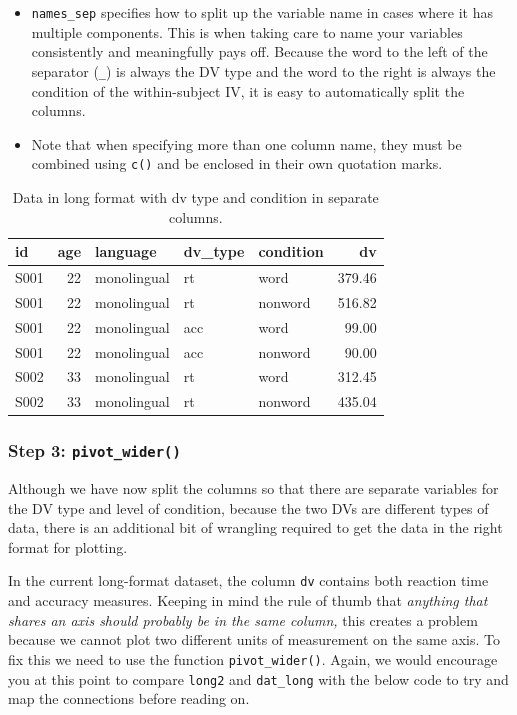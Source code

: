 \documentclass[
  english,
  doc,floatsintext]{apa6}
\begin{document}
\begin{itemize}
\item
  \texttt{names\_sep} specifies how to split up the variable name in cases where it has multiple components. This is when taking care to name your variables consistently and meaningfully pays off. Because the word to the left of the separator (\texttt{\_}) is always the DV type and the word to the right is always the condition of the within-subject IV, it is easy to automatically split the columns.
\item
  Note that when specifying more than one column name, they must be combined using \texttt{c()} and be enclosed in their own quotation marks.
\end{itemize}

\begin{table}

\caption{\label{tab:long-example}Data in long format with dv type and condition in separate columns.}
\centering
\begin{tabular}[t]{l|r|l|l|l|r}
\hline
id & age & language & dv\_type & condition & dv\\
\hline
S001 & 22 & monolingual & rt & word & 379.46\\
\hline
S001 & 22 & monolingual & rt & nonword & 516.82\\
\hline
S001 & 22 & monolingual & acc & word & 99.00\\
\hline
S001 & 22 & monolingual & acc & nonword & 90.00\\
\hline
S002 & 33 & monolingual & rt & word & 312.45\\
\hline
S002 & 33 & monolingual & rt & nonword & 435.04\\
\hline
\end{tabular}
\end{table}

\hypertarget{step-3-pivot_wider}{%
\subsubsection{\texorpdfstring{Step 3: \texttt{pivot\_wider()}}{Step 3: pivot\_wider()}}\label{step-3-pivot_wider}}

Although we have now split the columns so that there are separate variables for the DV type and level of condition, because the two DVs are different types of data, there is an additional bit of wrangling required to get the data in the right format for plotting.

In the current long-format dataset, the column \texttt{dv} contains both reaction time and accuracy measures. Keeping in mind the rule of thumb that \emph{anything that shares an axis should probably be in the same column,} this creates a problem because we cannot plot two different units of measurement on the same axis. To fix this we need to use the function \texttt{pivot\_wider()}. Again, we would encourage you at this point to compare \texttt{long2} and \texttt{dat\_long} with the below code to try and map the connections before reading on.
\end{document}
